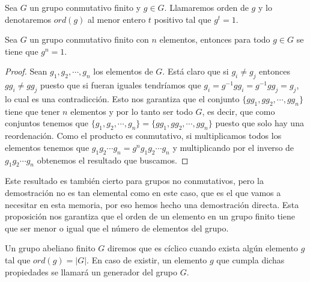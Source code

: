 \begin{definition}
Sea $G$ un grupo conmutativo finito y $g \in G$. Llamaremos orden de $g$ y lo denotaremos
$ord(g)$ al menor entero $t$ positivo tal que $g^t = 1$.
\end{definition}

\begin{proposition}
\label{propLagrange1}
Sea $G$ un grupo conmutativo finito con $n$ elementos, entonces para todo
$g \in G$ se tiene que $g^n = 1$.
\end{proposition}
\begin{proof}
Sean $g_1,g_2,\cdots,g_n$ los elementos de $G$. Est\'a claro que si $g_i \not= g_j$ entonces $gg_i \not= gg_j$ puesto que si fueran iguales tendr\'iamos que $g_i = g^{-1}gg_i = g^{-1}gg_j = g_j$, lo cual es una contradicci\'on.
Esto nos garantiza que el conjunto $\{gg_1,gg_2,\cdots,gg_n\}$ tiene que tener $n$ elementos y por lo tanto ser todo $G$, es decir, que como conjuntos tenemos que
$\{g_1,g_2,\cdots,g_n\} = \{gg_1,gg_2,\cdots,gg_n\}$ puesto que solo hay una reordenaci\'on. Como el producto es conmutativo, si multiplicamos todos los elementos tenemos que
$g_1g_2\cdots g_n = g^n g_1g_2\cdots g_n$ y multiplicando por el inverso de $g_1g_2\cdots g_n$ obtenemos el resultado que buscamos.
\end{proof}

Este resultado es tambi\'en cierto para grupos no conmutativos, pero la demostraci\'on no es tan elemental como en este caso, que es el que vamos a necesitar en esta memoria, por
eso hemos hecho una demostraci\'on directa. Esta proposici\'on nos garantiza que el orden de un elemento en un grupo finito tiene que ser menor o igual que el n\'umero de elementos del grupo.

\begin{definition}
Un grupo abeliano finito $G$ diremos que es c\'iclico cuando exista alg\'un elemento
$g$ tal que $ord(g) = |G|$. En caso de existir, un elemento $g$ que cumpla dichas
propiedades se llamar\'a un generador del grupo $G$.
\end{definition}

\hfil


